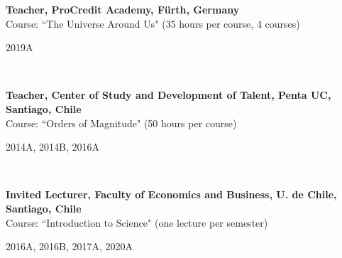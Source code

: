 \documentclass[12pt, a4paper]{article} %
\begin{document}
\begin{minipage}[t]{0.7\textwidth}
\begin{flushleft}%
  \setlength{\leftskip}{0.2cm}%
\textbf{Teacher, ProCredit Academy, F\"urth, Germany}\\
Course: ``The Universe Around Us" (35 hours per course, 4 courses)
\end{flushleft}
\end{minipage}
\begin{minipage}[t]{0.3\textwidth}
\hfill 2019A
\end{minipage}\\

\begin{minipage}[t]{0.7\textwidth}
\begin{flushleft}%
  \setlength{\leftskip}{0.2cm}%
\textbf{Teacher, Center of Study and Development of Talent, Penta UC, Santiago, Chile}\\
Course: ``Orders of Magnitude" (50 hours per course)
\end{flushleft}
\end{minipage}
\begin{minipage}[t]{0.3\textwidth}
\hfill 2014A, 2014B, 2016A
\end{minipage}\\

\begin{minipage}[t]{0.7\textwidth}
\begin{flushleft}%
  \setlength{\leftskip}{0.2cm}%
\textbf{Invited Lecturer, Faculty of Economics and Business, U. de Chile, Santiago, Chile}\\
Course: ``Introduction to Science" (one lecture per semester)
\end{flushleft}
\end{minipage}
\begin{minipage}[t]{0.3\textwidth}
\hfill 2016A, 2016B, 2017A, 2020A
\end{minipage}
\end{document}
